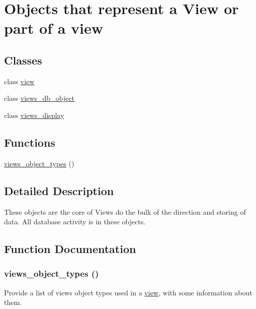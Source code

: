 \hypertarget{group__views__objects}{
\section{Objects that represent a View or part of a view}
\label{group__views__objects}
}
\subsection*{Classes}
\begin{DoxyCompactItemize}
\item 
class \hyperlink{classview}{view}
\item 
class \hyperlink{classviews__db__object}{views\_\-db\_\-object}
\item 
class \hyperlink{classviews__display}{views\_\-display}
\end{DoxyCompactItemize}
\subsection*{Functions}
\begin{DoxyCompactItemize}
\item 
\hyperlink{group__views__objects_gad8249e4064daa263cdadc049caff2c95}{views\_\-object\_\-types} ()
\end{DoxyCompactItemize}


\subsection{Detailed Description}
These objects are the core of Views do the bulk of the direction and storing of data. All database activity is in these objects. 

\subsection{Function Documentation}
\hypertarget{group__views__objects_gad8249e4064daa263cdadc049caff2c95}{
\subsubsection[{views\_\-object\_\-types}]{\setlength{\rightskip}{0pt plus 5cm}views\_\-object\_\-types ()}}
\label{group__views__objects_gad8249e4064daa263cdadc049caff2c95}
Provide a list of views object types used in a \hyperlink{classview}{view}, with some information about them. 